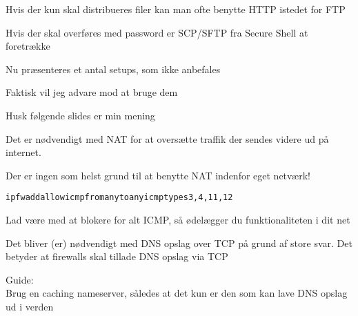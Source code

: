 \documentclass[Screen16to9,17pt]{foils}
\begin{document}

\begin{list1}
\item Hvis der kun skal distribueres filer kan man ofte benytte HTTP istedet for FTP
\item Hvis der skal overføres med password er SCP/SFTP fra Secure Shell at foretrække
\end{list1}



\begin{list1}
\item Nu præsenteres et antal setups, som ikke anbefales
\item Faktisk vil jeg advare mod at bruge dem
\item Husk følgende slides er min mening
\end{list1}



\begin{list1}
\item Det er nødvendigt med NAT for at oversætte traffik der sendes videre
ud på internet.
\item Der er ingen som helst grund til at benytte NAT indenfor eget netværk!
\end{list1}


\begin{alltt}
ipfw add allow icmp from any to any icmptypes 3,4,11,12
\end{alltt}

\begin{list1}
\item Lad være med at blokere for alt ICMP, så ødelægger du funktionaliteten i dit net
\vskip 1cm
\item \end{list1}


\begin{list1}
\item Det bliver (er) nødvendigt med DNS opslag over TCP på grund af store svar. Det betyder at firewalls skal tillade DNS opslag via TCP
\vskip 1cm
\item
\item Guide:\\
Brug en caching nameserver, således at det kun er den som kan lave DNS opslag ud i verden

\end{list1}
\end{document}
